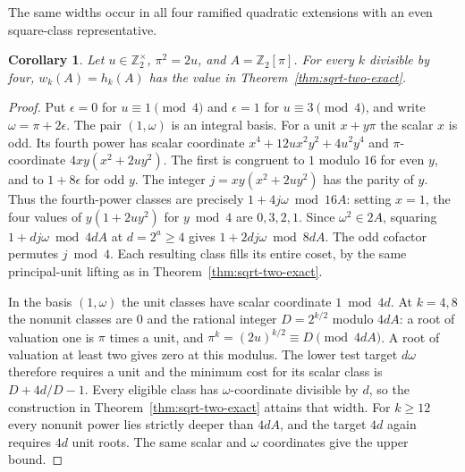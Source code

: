 \documentclass[11pt,letterpaper]{article}
\newtheorem{corollary}[corollary]{Corollary}
\theoremstyle{definition}
\numberwithin{equation}{section}
\begin{document}
The same widths occur in all four ramified quadratic extensions with
an even square-class representative.

\begin{corollary}\label{cor:even-radicand-widths}
Let $u\in\mathbb Z_2^\times$, $\pi^2=2u$, and
$A=\mathbb Z_2[\pi]$. For every $k$ divisible by four,
$w_k(A)=h_k(A)$ has the value in Theorem~\ref{thm:sqrt-two-exact}.
\end{corollary}
\begin{proof}
Put $\epsilon=0$ for $u\equiv1\pmod4$ and $\epsilon=1$ for
$u\equiv3\pmod4$, and write $\omega=\pi+2\epsilon$.
The pair $(1,\omega)$ is an integral basis. For a unit $x+y\pi$
the scalar $x$ is odd. Its fourth power has scalar coordinate
$x^4+12ux^2y^2+4u^2y^4$ and $\pi$-coordinate
$4xy(x^2+2uy^2)$. The first is congruent to $1$ modulo $16$ for
even $y$, and to $1+8\epsilon$ for odd $y$. The integer
$j=xy(x^2+2uy^2)$ has the parity of $y$. Thus the fourth-power
classes are precisely $1+4j\omega\bmod16A$: setting $x=1$, the
four values of $y(1+2uy^2)$ for $y\bmod4$ are $0,3,2,1$.
Since $\omega^2\in2A$, squaring $1+dj\omega\bmod4dA$ at
$d=2^a\ge4$ gives $1+2dj\omega\bmod8dA$. The odd cofactor
permutes $j\bmod4$. Each resulting class fills its entire coset,
by the same principal-unit lifting as in Theorem~\ref{thm:sqrt-two-exact}.

In the basis $(1,\omega)$ the unit classes have scalar coordinate
$1\bmod4d$. At $k=4,8$ the nonunit classes are $0$ and the
rational integer $D=2^{k/2}$ modulo $4dA$: a root of valuation one
is $\pi$ times a unit, and $\pi^k=(2u)^{k/2}\equiv D\pmod{4dA}$.
A root of valuation at least two gives zero at this modulus.
The lower test target $d\omega$ therefore requires a unit and
the minimum cost for its scalar class is $D+4d/D-1$.
Every eligible class has $\omega$-coordinate divisible by $d$,
so the construction in Theorem~\ref{thm:sqrt-two-exact}
attains that width. For $k\ge12$ every nonunit power lies strictly
deeper than $4dA$, and the target $4d$ again requires $4d$ unit
roots. The same scalar and $\omega$ coordinates give the upper bound.
\end{proof}
\end{document}
